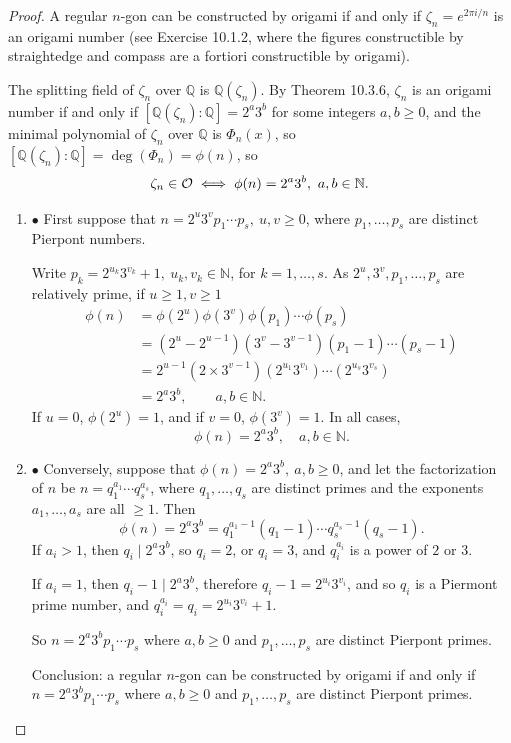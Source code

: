 \documentclass[11pt,a4paper]{article}
\newcommand{\be} {\begin{enumerate}}
\newcommand{\ee} {\end{enumerate}}
\newcommand{\Q}{\mathbb{Q}}
\newcommand{\N}{\mathbb{N}}
\begin{document}
\begin{proof}
A regular $n$-gon can be constructed by origami if and only if $\zeta_n = e^{2\pi i/n}$ is an origami number (see Exercise 10.1.2, where the figures constructible by straightedge and compass are a fortiori constructible by origami). 

The splitting field of $\zeta_n$ over $\Q$ is $\Q(\zeta_n)$.
By Theorem 10.3.6, $\zeta_n$ is an origami number if and only if $[\Q(\zeta_n):\Q] = 2^a 3 ^b$ for some integers $a,b \geq 0$, and the minimal polynomial of $\zeta_n$ over $\Q$ is $\Phi_n(x)$, so $[\Q(\zeta_n):\Q]  = \deg(\Phi_n) = \phi(n)$, so
$$\zeta_n \in {\cal O} \iff \phi(n)=2^a 3^b,\ a,b \in \N.$$
\be
\item[$\bullet$] First suppose that $n=2^u3^v p_1\cdots p_s, \ u,v \geq 0$, where $p_1,\ldots,p_s$ are distinct Pierpont numbers.

Write $p_k = 2^{u_k}3^{v_k}+1, \ u_k, v_k \in \N$, for $k=1,\ldots,s$. As $2^u, 3^v, p_1,\ldots,p_s$ are relatively prime, if $u\geq 1,v \geq 1$ 
\begin{align*}
\phi(n) &= \phi(2^u) \phi(3^v) \phi(p_1)\cdots \phi(p_s) \\
	&=  (2^u- 2^{u-1}) (3^v - 3^{v-1}) (p_1-1)\cdots(p_s-1)\\
	&= 2^{u-1} ( 2 \times 3^{v-1}) (2^{u_1}3^{v_1}) \cdots (2^{u_s}3^{v_s})\\
	&= 2^a 3^b,\qquad a,b \in \N.
\end{align*}
If $u=0$, $\phi(2^u) = 1$, and if $v=0$, $\phi(3^v) = 1$. In all cases,
$$ \phi(n)=2^a 3^b,\quad a,b \in \N.$$

\item[$\bullet$] Conversely, suppose that $\phi(n)=2^a 3^b,\ a,b \geq 0$, and let the factorization of $n$ be $n = q_1^{a_1}\cdots q_s^{a_s}$, where $q_1,\ldots,q_s$ are distinct primes and the exponents $a_1,\ldots, a_s$ are all $\geq 1$. Then
$$\phi(n) = 2^a 3^b = q_1^{a_1-1}(q_1-1)\cdots q_s^{a_s-1}(q_s-1).$$
If $a_i > 1$, then $q_i \mid 2^a 3^b$, so $q_i = 2$, or $q_i=3$, and $q_i^{a_i}$ is a power of $2$ or $3$.

If $a_i=1$, then $q_i-1 \mid 2^a 3^b$, therefore $q_i - 1 = 2^{u_i} 3^{v_i}$, and so $q_i$ is a Piermont prime number, and $q_i^{a_i} = q_i =2^{u_i} 3^{v_i}+1$.

So $n = 2^a 3^b p_1 \cdots p_s$ where $a,b\geq 0$ and $p_1,\ldots,p_s$ are distinct Pierpont primes.

Conclusion: a regular $n$-gon can be constructed by origami if and only if $n = 2^a 3^b p_1 \cdots p_s$ where $a,b\geq 0$ and $p_1,\ldots,p_s$ are distinct Pierpont primes.
\ee
\end{proof}
\end{document}
